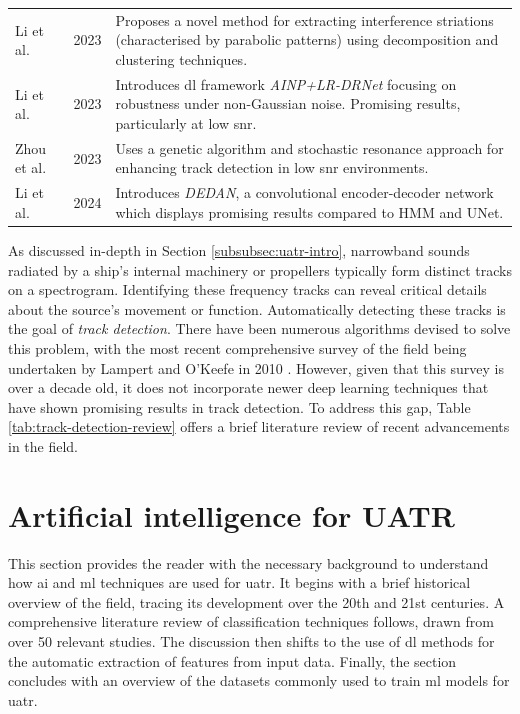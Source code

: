 \begin{table}
\begin{tabular}{llp{16cm}}
Li et al. \cite{li_method_2023} & 2023 & Proposes a novel method for extracting interference striations (characterised by parabolic patterns) using decomposition and clustering techniques.\\
Li et al. \cite{li_joint_2023} & 2023 & Introduces \acrshort{dl} framework \textit{AINP+LR-DRNet} focusing on robustness under non-Gaussian noise. Promising results, particularly at low \acrshort{snr}.\\
Zhou et al. \cite{zhou_weak_2023} & 2023 & Uses a genetic algorithm and stochastic resonance approach for enhancing track detection in low \acrshort{snr} environments. \\
Li et al. \cite{li_weak_2024} & 2024 & Introduces \textit{DEDAN}, a convolutional encoder-decoder network which displays promising results compared to HMM and UNet. \\ \bottomrule
\end{tabular}
\end{table}

As discussed in-depth in Section \ref{subsubsec:uatr-intro}, narrowband sounds radiated by a ship's internal machinery or propellers typically form distinct tracks on a spectrogram. Identifying these frequency tracks can reveal critical details about the source's movement or function. Automatically detecting these tracks is the goal of \textit{track detection}. There have been numerous algorithms devised to solve this problem, with the most recent comprehensive survey of the field being undertaken by Lampert and O'Keefe in 2010 \cite{lampert_survey_2010}. However, given that this survey is over a decade old, it does not incorporate newer deep learning techniques that have shown promising results in track detection. To address this gap, Table \ref{tab:track-detection-review} offers a brief literature review of recent advancements in the field.


\section{Artificial intelligence for UATR}

This section provides the reader with the necessary background to understand how \acrlong{ai} and \acrlong{ml} techniques are used for \acrshort{uatr}. It begins with a brief historical overview of the field, tracing its development over the 20th and 21st centuries. A comprehensive literature review of classification techniques follows, drawn from over 50 relevant studies. The discussion then shifts to the use of \acrlong{dl} methods for the automatic extraction of features from input data. Finally, the section concludes with an overview of the datasets commonly used to train \acrshort{ml} models for \acrshort{uatr}.

